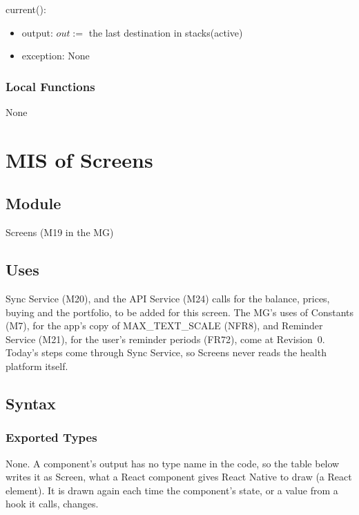 \documentclass[12pt, titlepage]{article}
\begin{document}
\noindent current():
\begin{itemize}
\item output: $out :=$ the last destination in stacks(active)
\item exception: None
\end{itemize}

\subsubsection{Local Functions}

None

\par\endgroup

\newpage

\section{MIS of Screens} \label{MisScreens}

\subsection{Module}

Screens (M19 in the MG)

\subsection{Uses}

Sync Service (M20), and the API Service (M24) calls for the balance, prices,
buying and the portfolio, to be added for this screen. The MG's uses of
Constants (M7), for the app's copy of MAX\_TEXT\_SCALE (NFR8), and Reminder
Service (M21), for the user's reminder periods (FR72), come at Revision~0.
Today's steps come through Sync Service, so Screens never reads the health
platform itself.

\subsection{Syntax}

\subsubsection{Exported Types}

\noindent None. A component's output has no type name in the code, so the
table below writes it as Screen, what a React component gives React Native to
draw (a React element). It is drawn again each time the component's state, or
a value from a hook it calls, changes.
\end{document}
